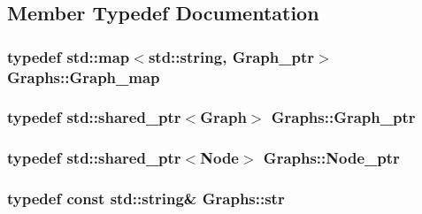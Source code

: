\subsection{Member Typedef Documentation}
\hypertarget{classGraphs_ae84f43c27f4abeec92270c954a9255d4}{
\subsubsection[{Graph\-\_\-map}]{\setlength{\rightskip}{0pt plus 5cm}typedef std\-::map$<$std\-::string, {\bf Graph\-\_\-ptr}$>$ {\bf Graphs\-::\-Graph\-\_\-map}}}\label{classGraphs_ae84f43c27f4abeec92270c954a9255d4}
\hypertarget{classGraphs_a58b4b65d81870fc3b2936c068b644a4d}{
\subsubsection[{Graph\-\_\-ptr}]{\setlength{\rightskip}{0pt plus 5cm}typedef std\-::shared\-\_\-ptr$<${\bf Graph}$>$ {\bf Graphs\-::\-Graph\-\_\-ptr}}}\label{classGraphs_a58b4b65d81870fc3b2936c068b644a4d}
\hypertarget{classGraphs_a2804b752d72989344f11a6ec3145eea8}{
\subsubsection[{Node\-\_\-ptr}]{\setlength{\rightskip}{0pt plus 5cm}typedef std\-::shared\-\_\-ptr$<${\bf Node}$>$ {\bf Graphs\-::\-Node\-\_\-ptr}}}\label{classGraphs_a2804b752d72989344f11a6ec3145eea8}
\hypertarget{classGraphs_a98a6f0415cbeae8adc7500164c78e3f3}{
\subsubsection[{str}]{\setlength{\rightskip}{0pt plus 5cm}typedef const std\-::string\& {\bf Graphs\-::str}}}\label{classGraphs_a98a6f0415cbeae8adc7500164c78e3f3}


